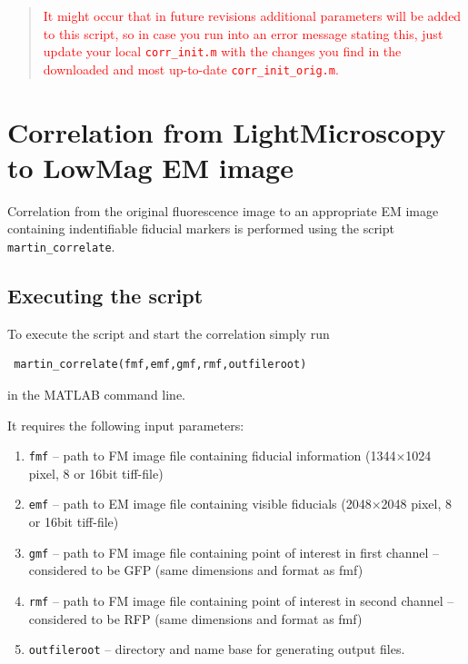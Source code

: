 \documentclass[10pt,a4paper,onepage,DIV12]{scrartcl}
\begin{document}
\begin{quote}\textcolor{red}{
   It might occur that in future revisions additional parameters will be added to this script, so in case you run into an error message stating this, just update your local \texttt{corr\_init.m} with the changes you find in the downloaded and most up-to-date \texttt{corr\_init\_orig.m}.}
 \end{quote}
 
\newpage
\section{Correlation from LightMicroscopy to LowMag EM image}

Correlation from the original fluorescence image to an appropriate EM image containing indentifiable fiducial markers is performed using the script \texttt{martin\_correlate}.

\subsection{Executing the script}
To execute the script and start the correlation simply run \begin{verbatim}
 martin_correlate(fmf,emf,gmf,rmf,outfileroot)
\end{verbatim}
 in the MATLAB command line.
 
It requires the following input parameters:
\begin{enumerate}
 \item\texttt{fmf} -- path to FM image file containing fiducial information (1344$\times$1024 pixel, 8 or 16bit tiff-file)
 \item\texttt{emf} -- path to EM image file containing visible fiducials (2048$\times$2048 pixel, 8 or 16bit tiff-file)
 \item\texttt{gmf} -- path to FM image file containing point of interest in first channel -- considered to be GFP (same dimensions and format as fmf)
 \item\texttt{rmf} -- path to FM image file containing point of interest in second channel -- considered to be RFP (same dimensions and format as fmf)
 \item\texttt{outfileroot} -- directory and name base for generating output files.
\end{enumerate}
\newpage
\end{document}
